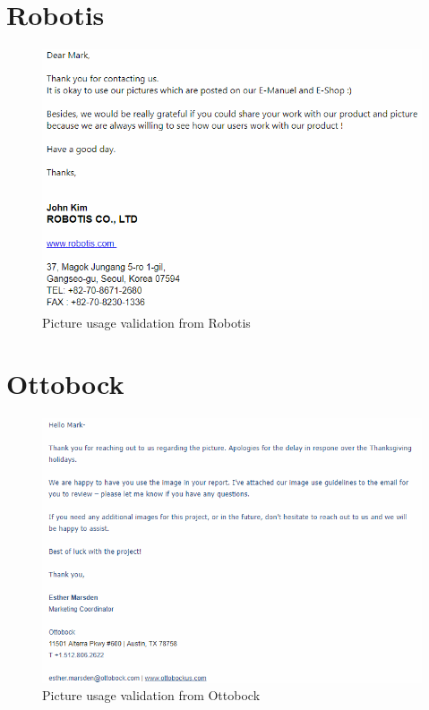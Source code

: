 \section*{Robotis}\label{st:Robotis}
\begin{figure}[H]
    \centering
    \includegraphics{Figures/Technical_figures/ROBOtisPERM.PNG}
    \caption{Picture usage validation from Robotis \cite{PIDmxx}}
\end{figure}
\newpage
\section*{Ottobock}\label{st:Ottobock}
\begin{figure}[H]
    \centering
    \includegraphics{Figures/Technical_figures/permOtto.PNG}
    \caption{Picture usage validation from Ottobock}
    \label{fig:ottobockperm}
\end{figure}